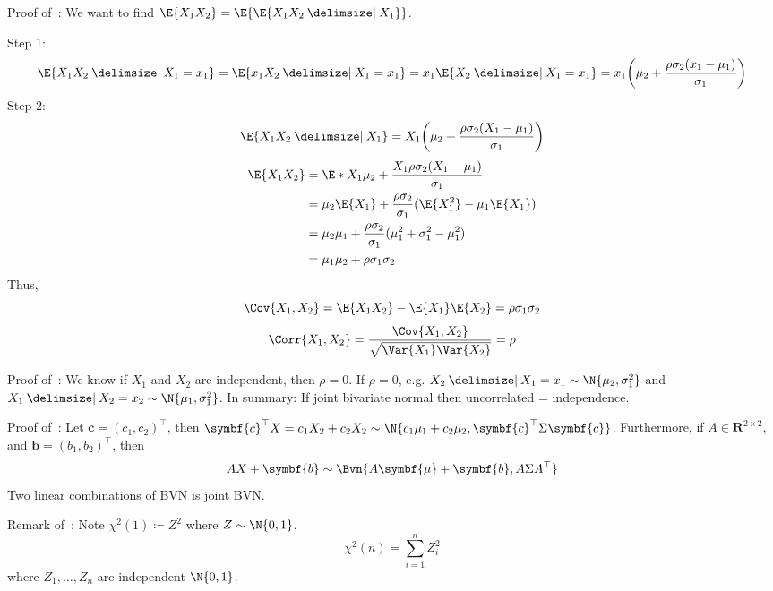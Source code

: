 \begin{Proof}{}{}
    Proof of~: We want to find $ \E{X_1X_2}=\E{\E{X_1X_2\given X_1}} $.

    Step 1:
    \[ \E{X_1X_2\given X_1=x_1}=\E{x_1X_2\given X_1=x_1}=
        x_1\E{X_2\given X_1=x_1}=x_1
        \biggl(  \mu_2+\frac{\rho\sigma_2(x_1-\mu_1)}{\sigma_1} \biggr) \]
    Step 2:
    \[ \E{X_1X_2\given X_1}=X_1
        \biggl(  \mu_2+\frac{\rho\sigma_2(X_1-\mu_1)}{\sigma_1} \biggr)
    \]
    \begin{align*}
        \E{X_1X_2}
         & = \E*{X_1\mu_2+\frac{X_1\rho\sigma_2(X_1-\mu_1)}{\sigma_1}}            \\
         & =\mu_2\E{X_1}+\frac{\rho\sigma_2}{\sigma_1}
        (\E{X_1^2}-\mu_1\E{X_1})                                                  \\
         & =\mu_2\mu_1+\frac{\rho\sigma_2}{\sigma_1}( \mu_1^2+\sigma_1^2-\mu_1^2) \\
         & =\mu_1\mu_2+\rho\sigma_1\sigma_2
    \end{align*}
    Thus,
    \[ \Cov{X_1,X_2}=\E{X_1X_2}-\E{X_1}\E{X_2}=\rho\sigma_1\sigma_2  \]
    \[ \Corr{X_1,X_2}=\frac{\Cov{X_1,X_2}}{\sqrt{\Var{X_1}\Var{X_2}}}=\rho  \]

    Proof of~: We know if $ X_1 $ and $ X_2 $ are independent, then $ \rho=0 $.
    If $ \rho=0 $, e.g. $ X_2\given X_1=x_1 \sim \N{\mu_2,\sigma_1^2} $
    and $ X_1\given X_2=x_2 \sim \N{\mu_1,\sigma_1^2} $.
    In summary: If joint bivariate normal then uncorrelated = independence.

    Proof of~: Let $ \symbf{c}=(c_1,c_2)^\top $, then
    $ \symbf{c}^\top X=c_1X_2+c_2X_2 \sim \N{c_1\mu_1+c_2\mu_2,\symbf{c}^\top \Sigma\symbf{c}} $.
    Furthermore, if $ A\in\mathbf{R}^{2\times 2} $, and
    $ \symbf{b}=(b_1,b_2)^\top $, then
    \[ AX+\symbf{b} \sim \Bvn{A\symbf{\mu}+\symbf{b},A\Sigma A^\top} \]
    Two linear combinations of BVN is joint BVN.\
\end{Proof}
\begin{Remark}{}{}
    Remark of~: Note $ \chi^2(1)\coloneq Z^2 $ where $ Z \sim \N{0,1} $.
    \[ \chi^2(n)=
        \sum_{i=1}^{n} Z_i^2 \]
    where $ Z_1,\ldots,Z_n $ are independent $ \N{0,1} $.
\end{Remark}
